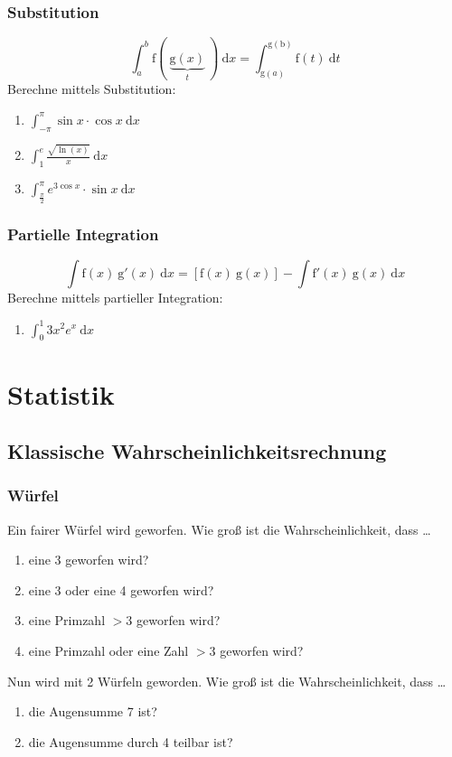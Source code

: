 \documentclass[11pt, a4paper]{article}
\newcommand{\intend}[1][]{\ \mathrm{d}#1}
\begin{document}
\subsubsection{Substitution}
\[ \int_a^b \mathrm{f}( \ \underbrace{\mathrm{g}(x)}_t \ ) \intend{x} = \int_{\mathrm{g}(a)}^{\mathrm{g(b)}} \mathrm{f}(t) \intend{t} \]
Berechne mittels Substitution:
\begin{enumerate}
	\item $\int_{-\pi}^\pi \sin{x} \cdot \cos{x} \intend{x}$
	\item $\int_1^e \frac{\sqrt{\ln(x)}}{x} \intend{x}$
	\item $\int_\frac{\pi}{2}^\pi e^{3 \cos x} \cdot \sin x \intend{x}$
\end{enumerate}

\subsubsection{Partielle Integration}
\[ \int \mathrm{f}(x) \ \mathrm{g}'(x) \intend{x} = \left[ \mathrm{f}(x) \ \mathrm{g}(x) \right] - \int \mathrm{f}'(x) \ \mathrm{g}(x) \intend{x} \]
Berechne mittels partieller Integration:
\begin{enumerate}
	\item $\int_0^1 3x^2 e^x \intend{x}$
\end{enumerate}

\newpage
\section{Statistik}
\subsection{Klassische Wahrscheinlichkeitsrechnung}
\subsubsection{Würfel}
Ein fairer Würfel wird geworfen. Wie groß ist die Wahrscheinlichkeit, dass \dots
\begin{enumerate}
	\item eine 3 geworfen wird?
	\item eine 3 oder eine 4 geworfen wird?
	\item eine Primzahl $> 3$ geworfen wird?
	\item eine Primzahl oder eine Zahl $> 3$ geworfen wird?
\end{enumerate}
Nun wird mit 2 Würfeln geworden. Wie groß ist die Wahrscheinlichkeit, dass \dots
\begin{enumerate}
	\item die Augensumme 7 ist?
	\item die Augensumme durch 4 teilbar ist?
\end{enumerate}
\end{document}
